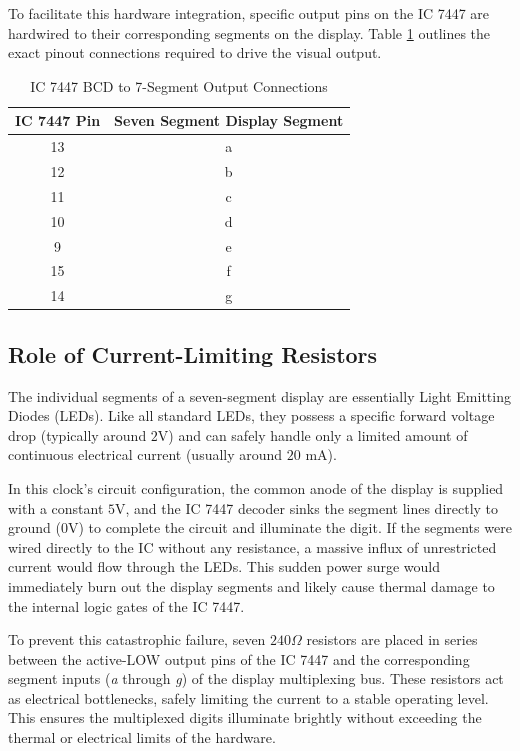 \documentclass[journal,12pt,onecolumn]{IEEEtran}
\begin{document}
		To facilitate this hardware integration, specific output pins on the IC 7447 are hardwired to their corresponding segments on the display. Table \ref{tab:ic7447_pins} outlines the exact pinout connections required to drive the visual output.
		
		\begin{table}[H]
			\centering
			\renewcommand{\arraystretch}{1.2}
			\begin{tabular}{|c|c|}
				\hline
				\textbf{IC 7447 Pin} & \textbf{Seven Segment Display Segment} \\
				\hline
				13 & a \\
				\hline
				12 & b \\
				\hline
				11 & c \\
				\hline
				10 & d \\
				\hline
				9  & e \\
				\hline
				15 & f \\
				\hline
				14 & g \\
				\hline
			\end{tabular}
			\caption{IC 7447 BCD to 7-Segment Output Connections}
			\label{tab:ic7447_pins}
		\end{table}
		
		
		
		\subsection{Role of Current-Limiting Resistors}
		The individual segments of a seven-segment display are essentially Light Emitting Diodes (LEDs). Like all standard LEDs, they possess a specific forward voltage drop (typically around $2\text{V}$) and can safely handle only a limited amount of continuous electrical current (usually around $20\text{ mA}$). 
		
		In this clock's circuit configuration, the common anode of the display is supplied with a constant $5\text{V}$, and the IC 7447 decoder sinks the segment lines directly to ground ($0\text{V}$) to complete the circuit and illuminate the digit. If the segments were wired directly to the IC without any resistance, a massive influx of unrestricted current would flow through the LEDs. This sudden power surge would immediately burn out the display segments and likely cause thermal damage to the internal logic gates of the IC 7447.
		
		To prevent this catastrophic failure, seven $240\Omega$ resistors are placed in series between the active-LOW output pins of the IC 7447 and the corresponding segment inputs (\textit{a} through \textit{g}) of the display multiplexing bus. These resistors act as electrical bottlenecks, safely limiting the current to a stable operating level. This ensures the multiplexed digits illuminate brightly without exceeding the thermal or electrical limits of the hardware.
		
\end{document}
